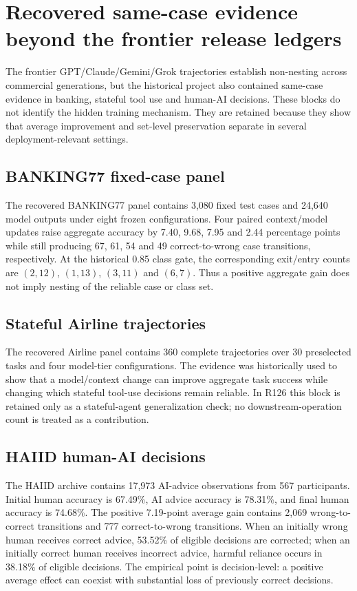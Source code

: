 \documentclass[11pt,letterpaper]{article}
\theoremstyle{plain}
\newcommand{\1}{\mathbf 1}
\begin{document}
\clearpage
\section{Recovered same-case evidence beyond the frontier release ledgers}
The frontier GPT/Claude/Gemini/Grok trajectories establish non-nesting across commercial generations, but the historical project also contained same-case evidence in banking, stateful tool use and human-AI decisions. These blocks do not identify the hidden training mechanism. They are retained because they show that average improvement and set-level preservation separate in several deployment-relevant settings.

\subsection{BANKING77 fixed-case panel}
The recovered BANKING77 panel contains 3,080 fixed test cases and 24,640 model outputs under eight frozen configurations. Four paired context/model updates raise aggregate accuracy by 7.40, 9.68, 7.95 and 2.44 percentage points while still producing 67, 61, 54 and 49 correct-to-wrong case transitions, respectively. At the historical 0.85 class gate, the corresponding exit/entry counts are $(2,12)$, $(1,13)$, $(3,11)$ and $(6,7)$. Thus a positive aggregate gain does not imply nesting of the reliable case or class set.

\subsection{Stateful Airline trajectories}
The recovered Airline panel contains 360 complete trajectories over 30 preselected tasks and four model-tier configurations. The evidence was historically used to show that a model/context change can improve aggregate task success while changing which stateful tool-use decisions remain reliable. In R126 this block is retained only as a stateful-agent generalization check; no downstream-operation count is treated as a contribution.

\subsection{HAIID human-AI decisions}
The HAIID archive contains 17,973 AI-advice observations from 567 participants. Initial human accuracy is 67.49\%, AI advice accuracy is 78.31\%, and final human accuracy is 74.68\%. The positive 7.19-point average gain contains 2,069 wrong-to-correct transitions and 777 correct-to-wrong transitions. When an initially wrong human receives correct advice, 53.52\% of eligible decisions are corrected; when an initially correct human receives incorrect advice, harmful reliance occurs in 38.18\% of eligible decisions. The empirical point is decision-level: a positive average effect can coexist with substantial loss of previously correct decisions.
\end{document}

